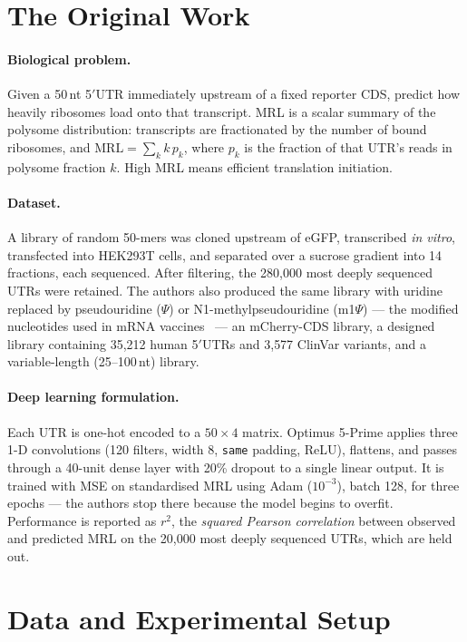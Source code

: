 \documentclass{article}
\begin{document}
\section{The Original Work}
\label{sec:paper}

\paragraph{Biological problem.} Given a 50\,nt 5$'$UTR immediately upstream of a fixed
reporter CDS, predict how heavily ribosomes load onto that transcript. MRL is a scalar
summary of the polysome distribution: transcripts are fractionated by the number of bound
ribosomes, and
$\mathrm{MRL} = \sum_{k} k \, p_k$,
where $p_k$ is the fraction of that UTR's reads in polysome fraction $k$. High MRL means
efficient translation initiation.

\paragraph{Dataset.} A library of random 50-mers was cloned upstream of eGFP, transcribed
\emph{in vitro}, transfected into HEK293T cells, and separated over a sucrose gradient into
14 fractions, each sequenced. After filtering, the 280{,}000 most deeply sequenced UTRs were
retained. The authors also produced the same library with uridine replaced by pseudouridine
($\Psi$) or N1-methylpseudouridine (m1$\Psi$) --- the modified nucleotides used in mRNA
vaccines~\citep{kariko2008} --- an mCherry-CDS library, a designed library containing 35{,}212 human 5$'$UTRs
and 3{,}577 ClinVar variants, and a variable-length (25--100\,nt) library.

\paragraph{Deep learning formulation.} Each UTR is one-hot encoded to a $50\times4$ matrix.
Optimus 5-Prime applies three 1-D convolutions (120 filters, width 8, \texttt{same} padding,
ReLU), flattens, and passes through a 40-unit dense layer with 20\% dropout to a single
linear output. It is trained with MSE on standardised MRL using Adam ($10^{-3}$), batch 128,
for three epochs --- the authors stop there because the model begins to overfit. Performance
is reported as $r^2$, the \emph{squared Pearson correlation} between observed and predicted
MRL on the 20{,}000 most deeply sequenced UTRs, which are held out.

\section{Data and Experimental Setup}
\label{sec:data}
\end{document}
